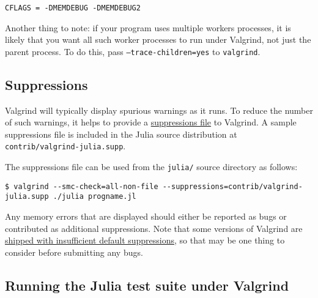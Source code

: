 \begin{verbatim}
CFLAGS = -DMEMDEBUG -DMEMDEBUG2
\end{verbatim}



Another thing to note: if your program uses multiple workers processes, it is likely that you want all such worker processes to run under Valgrind, not just the parent process.  To do this, pass \texttt{--trace-children=yes} to \texttt{valgrind}.



\hypertarget{9183907630008953484}{}


\subsection{Suppressions}



Valgrind will typically display spurious warnings as it runs.  To reduce the number of such warnings, it helps to provide a \href{http://valgrind.org/docs/manual/manual-core.html\#manual-core.suppress}{suppressions file} to Valgrind.  A sample suppressions file is included in the Julia source distribution at \texttt{contrib/valgrind-julia.supp}.



The suppressions file can be used from the \texttt{julia/} source directory as follows:




\begin{lstlisting}
$ valgrind --smc-check=all-non-file --suppressions=contrib/valgrind-julia.supp ./julia progname.jl
\end{lstlisting}



Any memory errors that are displayed should either be reported as bugs or contributed as additional suppressions.  Note that some versions of Valgrind are \href{https://github.com/JuliaLang/julia/issues/8314\#issuecomment-55766210}{shipped with insufficient default suppressions}, so that may be one thing to consider before submitting any bugs.



\hypertarget{10173787738831416739}{}


\subsection{Running the Julia test suite under Valgrind}



